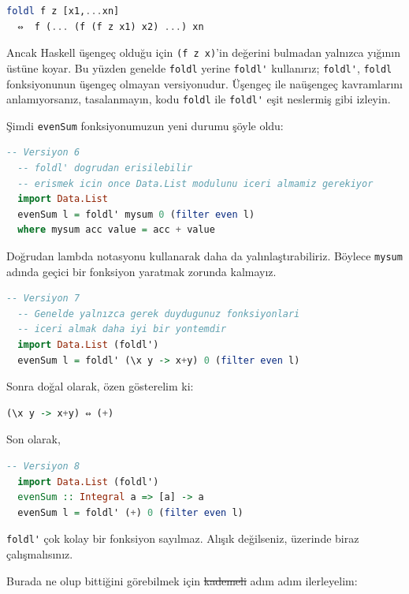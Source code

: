 \documentclass[a4paper,14pt,openany]{extbook} %
\begin{document}
\begin{lstlisting}[language=Haskell]
  foldl f z [x1,...xn]
  ⇔  f (... (f (f z x1) x2) ...) xn
\end{lstlisting}

Ancak Haskell üşengeç olduğu için \lstinline!(f z x)!'in değerini
bulmadan yalnızca yığının üstüne koyar. Bu yüzden genelde
\lstinline!foldl! yerine \lstinline!foldl'! kullanırız;
\lstinline!foldl'!, \lstinline!foldl! fonksiyonunun üşengeç olmayan
versiyonudur. Üşengeç ile naüşengeç kavramlarını anlamıyorsanız,
tasalanmayın, kodu \lstinline!foldl! ile \lstinline!foldl'! eşit
neslermiş gibi izleyin.

Şimdi \lstinline!evenSum! fonksiyonumuzun yeni durumu şöyle oldu:

\begin{lstlisting}[language=Haskell]
  -- Versiyon 6
  -- foldl' dogrudan erisilebilir
  -- erismek icin once Data.List modulunu iceri almamiz gerekiyor
  import Data.List
  evenSum l = foldl' mysum 0 (filter even l)
  where mysum acc value = acc + value
\end{lstlisting}

Doğrudan lambda notasyonu kullanarak daha da yalınlaştırabiliriz.
Böylece \lstinline!mysum! adında geçici bir fonksiyon yaratmak zorunda
kalmayız.

\begin{lstlisting}[language=Haskell]
  -- Versiyon 7
  -- Genelde yalnızca gerek duydugunuz fonksiyonlari
  -- iceri almak daha iyi bir yontemdir
  import Data.List (foldl')
  evenSum l = foldl' (\x y -> x+y) 0 (filter even l)
\end{lstlisting}

Sonra doğal olarak, özen gösterelim ki:

\begin{lstlisting}[language=Haskell]
  (\x y -> x+y) ⇔ (+)
\end{lstlisting}

Son olarak,

\begin{lstlisting}[language=Haskell]
  -- Versiyon 8
  import Data.List (foldl')
  evenSum :: Integral a => [a] -> a
  evenSum l = foldl' (+) 0 (filter even l)
\end{lstlisting}

\lstinline!foldl'! çok kolay bir fonksiyon sayılmaz. Alışık
değilseniz, üzerinde biraz çalışmalısınız.

Burada ne olup bittiğini görebilmek için \st{kademeli} adım adım ilerleyelim:
\end{document}
